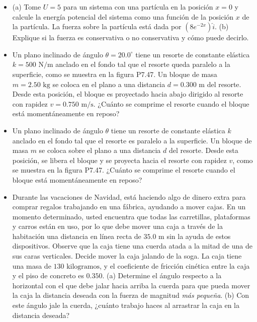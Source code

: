 \documentclass[11pt,a4paper]{article}
\begin{document}
\begin{itemize}
    \item[\textbf{46.}] (a) Tome $U = 5$ para un sistema con una partícula en la posición $x = 0$ y calcule la energía potencial del sistema como una función de la posición $x$ de la partícula. La fuerza sobre la partícula está dada por $(8e^{-2x})\hat{i}$. (b) Explique si la fuerza es conservativa o no conservativa y cómo puede decirlo.
    \vspace*{6cm}

    \item[\textbf{47.}] Un plano inclinado de ángulo $\theta = 20.0^\circ$ tiene un resorte de constante elástica $k = 500 \text{ N/m}$ anclado en el fondo tal que el resorte queda paralelo a la superficie, como se muestra en la figura P7.47. Un bloque de masa $m = 2.50 \text{ kg}$ se coloca en el plano a una distancia $d = 0.300 \text{ m}$ del resorte. Desde esta posición, el bloque es proyectado hacia abajo dirigido al resorte con rapidez $v = 0.750 \text{ m/s}$. ¿Cuánto se comprime el resorte cuando el bloque está momentáneamente en reposo?
    \vspace*{6cm}

    \item[\textbf{48.}] Un plano inclinado de ángulo $\theta$ tiene un resorte de constante elástica $k$ anclado en el fondo tal que el resorte es paralelo a la superficie. Un bloque de masa $m$ se coloca sobre el plano a una distancia $d$ del resorte. Desde esta posición, se libera el bloque y se proyecta hacia el resorte con rapidez $v$, como se muestra en la figura P7.47. ¿Cuánto se comprime el resorte cuando el bloque está momentáneamente en reposo?
    \vspace*{6cm}

    \item[\textbf{49.}] Durante las vacaciones de Navidad, está haciendo algo de dinero extra para comprar regalos trabajando en una fábrica, ayudando a mover cajas. En un momento determinado, usted encuentra que todas las carretillas, plataformas y carros están en uso, por lo que debe mover una caja a través de la habitación una distancia en línea recta de $35.0 \text{ m}$ sin la ayuda de estos dispositivos. Observe que la caja tiene una cuerda atada a la mitad de una de sus caras verticales. Decide mover la caja jalando de la soga. La caja tiene una masa de $130 \text{ kilogramos}$, y el coeficiente de fricción cinética entre la caja y el piso de concreto es $0.350$. (a) Determine el ángulo respecto a la horizontal con el que debe jalar hacia arriba la cuerda para que pueda mover la caja la distancia deseada con la fuerza de magnitud \textit{más pequeña}. (b) Con este ángulo jale la cuerda, ¿cuánto trabajo haces al arrastrar la caja en la distancia deseada?
    \vspace*{7cm}
\end{itemize}
\end{document}
